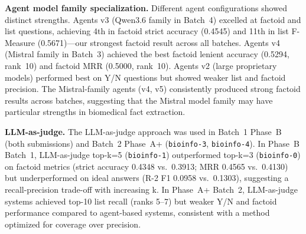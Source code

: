 \textbf{Agent model family specialization.} Different agent configurations showed distinct strengths. Agents v3 (Qwen3.6 family in Batch~4) excelled at factoid and list questions, achieving 4th in factoid strict accuracy (0.4545) and 11th in list F-Measure (0.5671)---our strongest factoid result across all batches. Agents v4 (Mistral family in Batch~3) achieved the best factoid lenient accuracy (0.5294, rank~10) and factoid MRR (0.5000, rank~10). Agents v2 (large proprietary models) performed best on Y/N questions but showed weaker list and factoid precision. The Mistral-family agents (v4, v5) consistently produced strong factoid results across batches, suggesting that the Mistral model family may have particular strengths in biomedical fact extraction.

\textbf{LLM-as-judge.} The LLM-as-judge approach was used in Batch~1 Phase~B (both submissions) and Batch~2 Phase~A+ (\texttt{bioinfo-3}, \texttt{bioinfo-4}). In Phase~B Batch~1, LLM-as-judge top-k=5 (\texttt{bioinfo-1}) outperformed top-k=3 (\texttt{bioinfo-0}) on factoid metrics (strict accuracy 0.4348 vs.\ 0.3913; MRR 0.4565 vs.\ 0.4130) but underperformed on ideal answers (R-2 F1 0.0958 vs.\ 0.1303), suggesting a recall-precision trade-off with increasing k. In Phase~A+ Batch~2, LLM-as-judge systems achieved top-10 list recall (ranks 5--7) but weaker Y/N and factoid performance compared to agent-based systems, consistent with a method optimized for coverage over precision.
